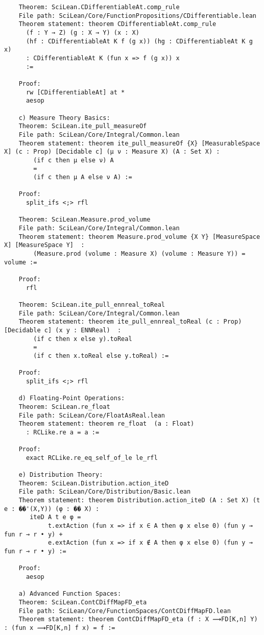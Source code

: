\documentclass{article} %
\begin{document}
\begin{verbatim}
    Theorem: SciLean.CDifferentiableAt.comp_rule
    File path: SciLean/Core/FunctionPropositions/CDifferentiable.lean
    Theorem statement: theorem CDifferentiableAt.comp_rule
      (f : Y → Z) (g : X → Y) (x : X)
      (hf : CDifferentiableAt K f (g x)) (hg : CDifferentiableAt K g x)
      : CDifferentiableAt K (fun x => f (g x)) x
      :=
    
    Proof:
      rw [CDifferentiableAt] at *
      aesop

    c) Measure Theory Basics:
    Theorem: SciLean.ite_pull_measureOf
    File path: SciLean/Core/Integral/Common.lean
    Theorem statement: theorem ite_pull_measureOf {X} [MeasurableSpace X] (c : Prop) [Decidable c] (μ ν : Measure X) (A : Set X) :
        (if c then μ else ν) A
        =
        (if c then μ A else ν A) :=
    
    Proof:
      split_ifs <;> rfl
    
    Theorem: SciLean.Measure.prod_volume
    File path: SciLean/Core/Integral/Common.lean
    Theorem statement: theorem Measure.prod_volume {X Y} [MeasureSpace X] [MeasureSpace Y]  :
        (Measure.prod (volume : Measure X) (volume : Measure Y)) = volume :=
    
    Proof:
      rfl
    
    Theorem: SciLean.ite_pull_ennreal_toReal
    File path: SciLean/Core/Integral/Common.lean
    Theorem statement: theorem ite_pull_ennreal_toReal (c : Prop) [Decidable c] (x y : ENNReal)  :
        (if c then x else y).toReal
        =
        (if c then x.toReal else y.toReal) :=
    
    Proof:
      split_ifs <;> rfl

    d) Floating-Point Operations:
    Theorem: SciLean.re_float
    File path: SciLean/Core/FloatAsReal.lean
    Theorem statement: theorem re_float  (a : Float)
      : RCLike.re a = a :=
    
    Proof:
      exact RCLike.re_eq_self_of_le le_rfl

    e) Distribution Theory:
    Theorem: SciLean.Distribution.action_iteD
    File path: SciLean/Core/Distribution/Basic.lean
    Theorem statement: theorem Distribution.action_iteD (A : Set X) (t e : ��'(X,Y)) (φ : �� X) :
       iteD A t e φ =
            t.extAction (fun x => if x ∈ A then φ x else 0) (fun y ⊸ fun r ⊸ r • y) +
            e.extAction (fun x => if x ∉ A then φ x else 0) (fun y ⊸ fun r ⊸ r • y) :=
    
    Proof:
      aesop

    a) Advanced Function Spaces:
    Theorem: SciLean.ContCDiffMapFD_eta
    File path: SciLean/Core/FunctionSpaces/ContCDiffMapFD.lean
    Theorem statement: theorem ContCDiffMapFD_eta (f : X ⟿FD[K,n] Y) : (fun x ⟿FD[K,n] f x) = f :=
    

\end{verbatim}
\end{document}
